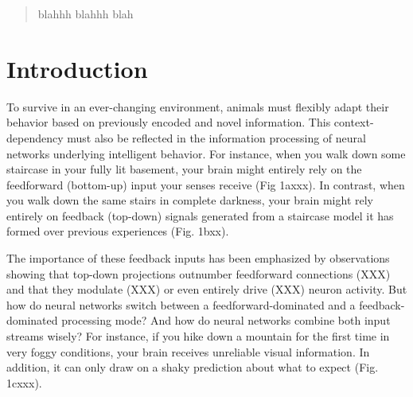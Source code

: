 \documentclass[10pt,a4paper,draft]{article}
\begin{document}
\thispagestyle{empty}

\begin{flushleft}
{\Large
\textbf{}
}

\end{flushleft}


\begin{abstract}
blahhh blahhh blah
\end{abstract}

\section*{Introduction}
%
To survive in an ever-changing environment, animals must flexibly adapt their behavior based on previously encoded and novel information. This context-dependency must also be reflected in the information processing of neural networks underlying intelligent behavior. For instance, when you walk down some staircase in your fully lit basement, your brain might entirely rely on the feedforward (bottom-up) input your senses receive (Fig 1axxx). In contrast, when you walk down the same stairs in complete darkness, your brain might rely entirely on feedback (top-down) signals generated from a staircase model it has formed over previous experiences (Fig. 1bxx). 

The importance of these feedback inputs has been emphasized by observations showing that top-down projections outnumber feedforward connections (XXX) and that they modulate (XXX) or even entirely drive (XXX) neuron activity. But how do neural networks switch between a feedforward-dominated and a feedback-dominated processing mode? And how do neural networks combine both input streams wisely? For instance, if you hike down a mountain for the first time in very foggy conditions, your brain receives unreliable visual information. In addition, it can only draw on a shaky prediction about what to expect (Fig. 1cxxx). 
\end{document}
